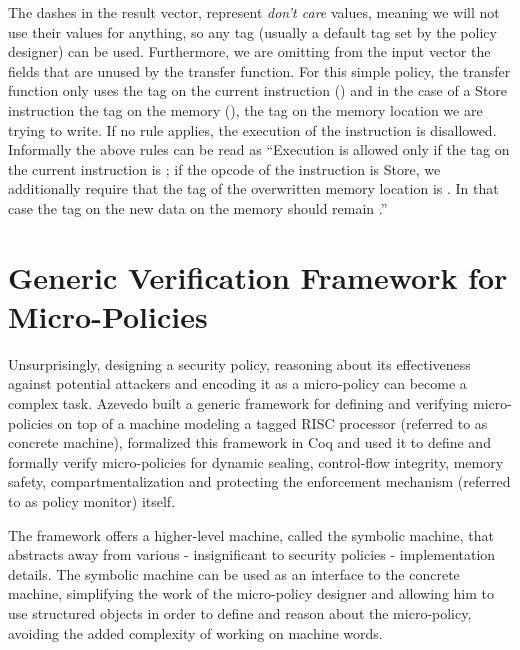 The dashes in the result vector, represent \textit{don't care} values,
meaning we will not use their values for anything, so any tag (usually
a default tag set by the policy designer) can be used.
Furthermore, we are omitting from the input vector the fields that are
unused by the transfer function. For this simple policy, the transfer
function only uses the tag on the current instruction () and in
the case of a Store instruction the tag on the memory (), \IE
the tag on the memory location we are trying to write. If no rule
applies, the execution of the instruction is disallowed. Informally
the above rules can be read as ``Execution is allowed only if the tag
on the current instruction is \INSTRname; if the opcode of the
instruction is Store, we additionally require that the tag of the
overwritten memory location is \DATA. In that case the tag on the new
data on the memory should remain \DATA.''

\section{Generic Verification Framework for Micro-Policies}
\label{sec:framework}

Unsurprisingly, designing a security policy, reasoning about its
effectiveness against potential attackers and encoding it as a
micro-policy can become a complex task. Azevedo \ETAL
\cite{popl2015} built a generic framework for defining and
verifying micro-policies on top of a machine modeling a tagged RISC
processor (referred to as concrete machine), formalized this framework
in Coq and used it to define and formally verify micro-policies for
dynamic sealing, control-flow integrity, memory safety,
compartmentalization and protecting the enforcement mechanism
(referred to as policy monitor) itself.

The framework offers a higher-level machine, called the symbolic
machine, that abstracts away from various - insignificant to security
policies - implementation details. The symbolic machine can be used as
an interface to the concrete machine, simplifying the work of the
micro-policy designer and allowing him to use structured objects in
order to define and reason about the micro-policy, avoiding the
added complexity of working on machine words.

